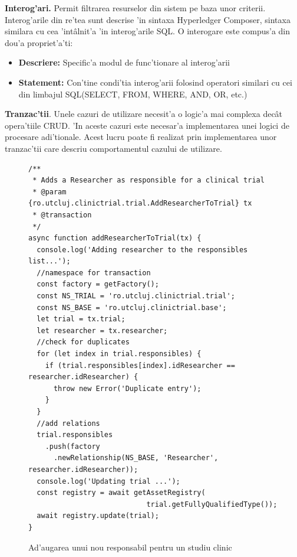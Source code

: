 \documentclass[12pt,a4paper,twoside]{report}
\begin{document}
\textbf{Interog'ari.} Permit filtrarea resurselor din sistem pe baza unor criterii. Interog'arile din re'tea sunt descrise 'in sintaxa Hyperledger Composer, sintaxa similara cu cea 'int\^alnit'a 'in interog'arile SQL. O interogare este compus'a din dou'a propriet'a'ti: 
\begin{itemize}
    \item \textbf{Descriere:} Specific'a modul de func'tionare al interog'arii
    \item \textbf{Statement:} Con'tine condi'tia interog'arii folosind operatori similari cu cei din limbajul SQL(SELECT, FROM, WHERE, AND, OR, etc.)
\end{itemize}

\textbf{Tranzac'tii}. Unele cazuri de utilizare necesit'a o logic'a mai complexa dec\^at opera'tiile CRUD. 'In aceste cazuri este necesar'a implementarea unei logici de procesare adi'tionale. Acest lucru poate fi realizat prin implementarea unor tranzac'tii care descriu comportamentul cazului de utilizare. 

    	\begin{figure}[H]
		\begin{center}
		
			\begin{lstlisting}[style=htmlcssjs]
/**
 * Adds a Researcher as responsible for a clinical trial
 * @param {ro.utcluj.clinictrial.trial.AddResearcherToTrial} tx 
 * @transaction
 */
async function addResearcherToTrial(tx) {
  console.log('Adding researcher to the responsibles list...');
  //namespace for transaction
  const factory = getFactory();
  const NS_TRIAL = 'ro.utcluj.clinictrial.trial';
  const NS_BASE = 'ro.utcluj.clinictrial.base';
  let trial = tx.trial;
  let researcher = tx.researcher;
  //check for duplicates
  for (let index in trial.responsibles) {
    if (trial.responsibles[index].idResearcher == researcher.idResearcher) {
      throw new Error('Duplicate entry');
    }
  }
  //add relations
  trial.responsibles
    .push(factory
      .newRelationship(NS_BASE, 'Researcher', researcher.idResearcher));
  console.log('Updating trial ...');
  const registry = await getAssetRegistry(
                            trial.getFullyQualifiedType());
  await registry.update(trial);
}
			\end{lstlisting}
			\caption{Ad'augarea unui nou responsabil pentru un studiu clinic}
  			\label{fig:tranz}
  		\end{center}
  		\end{figure}
\end{document}
